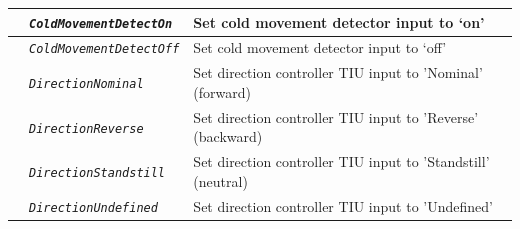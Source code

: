 \documentclass{template/openetcs}
\begin{document}
\begin{itemize}
\begin{longtable}{|l|l|l|}
			\hline
			
			&	\begin{minipage}[t]{0.40\linewidth} \emph{\texttt{ColdMovementDetectOn}} \end{minipage}
			&	\begin{minipage}[t]{0.38\linewidth} Set cold movement detector input to ‘on’ \end{minipage} \\
			
			\hline
			
			&	\begin{minipage}[t]{0.40\linewidth} \emph{\texttt{ColdMovementDetectOff}} \end{minipage}
			&	\begin{minipage}[t]{0.38\linewidth} Set cold movement detector input to ‘off’ \end{minipage} \\
			
			\hline
			
			&	\begin{minipage}[t]{0.40\linewidth} \emph{\texttt{DirectionNominal}} \end{minipage}
			&	\begin{minipage}[t]{0.38\linewidth} Set direction controller TIU input to ’Nominal’ (forward) \end{minipage} \\
			
			\hline
			
			&	\begin{minipage}[t]{0.40\linewidth} \emph{\texttt{DirectionReverse}} \end{minipage}
			&	\begin{minipage}[t]{0.38\linewidth} Set direction controller TIU input to ’Reverse’ (backward) \end{minipage} \\
			
			\hline
			
			&	\begin{minipage}[t]{0.40\linewidth} \emph{\texttt{DirectionStandstill}} \end{minipage}
			&	\begin{minipage}[t]{0.38\linewidth} Set direction controller TIU input to ’Standstill’ (neutral) \end{minipage} \\
			
			\hline
			
			&	\begin{minipage}[t]{0.40\linewidth} \emph{\texttt{DirectionUndefined}} \end{minipage}
			&	\begin{minipage}[t]{0.38\linewidth} Set direction controller TIU input to ’Undefined’ \end{minipage} \\
			

\end{longtable}
\end{itemize}
\end{document}
